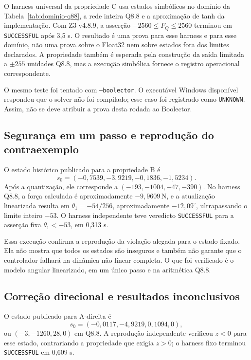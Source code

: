O harness universal da propriedade C usa estados simbólicos no domínio da
Tabela~\ref{tab:dominio-q88}, a rede inteira Q8.8 e a aproximação de tanh da
implementação. Com Z3 v4.8.9, a asserção
\(-2560\leq F_Q\leq2560\) terminou em \texttt{SUCCESSFUL} após 3,5 s. O
resultado é uma prova para esse harness e para esse domínio, não uma prova sobre
o Float32 nem sobre estados fora dos limites declarados. A propriedade também é
esperada pela construção da saída limitada a \(\pm255\) unidades Q8.8, mas a
execução simbólica fornece o registro operacional correspondente.

O mesmo teste foi tentado com \texttt{--boolector}. O executável Windows
disponível respondeu que o solver não foi compilado; esse caso foi registrado
como \texttt{UNKNOWN}. Assim, não se deve atribuir a prova desta rodada ao
Boolector.

\subsection{Segurança em um passo e reprodução do contraexemplo}

O estado histórico publicado para a propriedade B é
\[
s_0=(-0{,}7539,-3{,}9219,-0{,}1836,-1{,}5234).
\]
Após a quantização, ele corresponde a
\((-193,-1004,-47,-390)\). No harness Q8.8, a força calculada é
aproximadamente \(-9{,}9609\,\mathrm{N}\), e a atualização linearizada resulta em
\(\theta_1=-54/256\), aproximadamente \(-12{,}09^\circ\), ultrapassando o
limite inteiro \(-53\). O harness independente
 teve veredicto \texttt{SUCCESSFUL} para a
asserção fixa \(\theta_1<-53\), em 0,313 s.

Essa execução confirma a reprodução da violação alegada para o estado fixado.
Ela não mostra que todos os estados são inseguros e também não garante que o
controlador falhará na dinâmica não linear completa. O que foi verificado é o
modelo angular linearizado, em um único passo e na aritmética Q8.8.

\subsection{Correção direcional e resultados inconclusivos}

O estado publicado para A-direita é
\[
s_0=(-0{,}0117,-4{,}9219,0{,}1094,0),
\]
ou \((-3,-1260,28,0)\) em Q8.8. A reprodução independente verificou
\(z<0\) para esse estado, contrariando a propriedade que exigia \(z>0\); o
harness fixo terminou \texttt{SUCCESSFUL} em 0,609 s.

